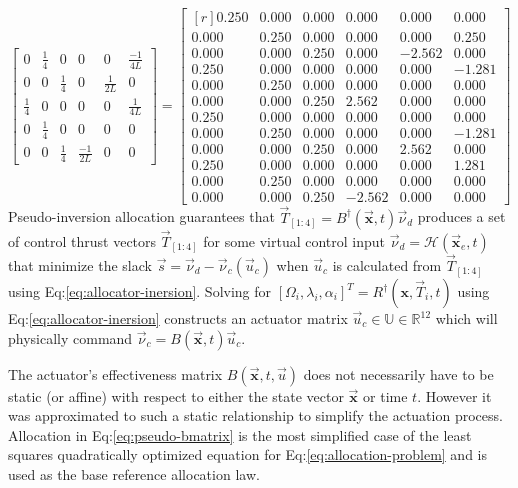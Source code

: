 \begin{subequations}
\begin{equation}
\begin{bmatrix}
0 & \frac{1}{4} & 0 & 0 & 0 & \frac{-1}{4L}\\
0 & 0 & \frac{1}{4} & 0 & \frac{1}{2L} & 0\\
\frac{1}{4} & 0 & 0 & 0 & 0 & \frac{1}{4L}\\
0 & \frac{1}{4} & 0 & 0 & 0 & 0\\
0 & 0 & \frac{1}{4} & \frac{-1}{2L} & 0 & 0
\end{bmatrix}
\end{equation}
\begin{equation}
=\begin{bmatrix*}[r]
0.250 & 0.000 & 0.000 & 0.000 & 0.000 & 0.000\\
0.000 & 0.250 & 0.000 & 0.000 & 0.000 & 0.250\\
0.000 & 0.000 & 0.250 & 0.000 & -2.562 & 0.000\\
0.250 & 0.000 & 0.000 & 0.000 & 0.000 & -1.281\\
0.000 & 0.250 & 0.000 & 0.000 & 0.000 & 0.000\\
0.000 & 0.000 & 0.250 & 2.562 & 0.000 & 0.000\\
0.250 & 0.000 & 0.000 & 0.000 & 0.000 & 0.000\\
0.000 & 0.250 & 0.000 & 0.000 & 0.000 & -1.281\\
0.000 & 0.000 & 0.250 & 0.000 & 2.562 & 0.000\\
0.250 & 0.000 & 0.000 & 0.000 & 0.000 & 1.281\\
0.000 & 0.250 & 0.000 & 0.000 & 0.000 & 0.000\\
0.000 & 0.000 & 0.250 & -2.562 & 0.000 & 0.000
\end{bmatrix*}
\end{equation}
\end{subequations}
Pseudo-inversion allocation guarantees that $\vec{T}_{[1:4]}=B^\dagger(\vec{\mathbf{x}},t)\vec{\nu}_d$ produces a set of control thrust vectors $\vec{T}_{[1:4]}$ for some virtual control input $\vec{\nu}_d=\mathcal{H}(\vec{\mathbf{x}}_e,t)$ that minimize the slack $\vec{s}=\vec{\nu}_d-\vec{\nu}_c(\vec{u}_c)$ when $\vec{u}_c$ is calculated from $\vec{T}_{[1:4]}$ using Eq:\ref{eq:allocator-inersion}. Solving for $[\Omega_i,\lambda_i,\alpha_i]^T=R^\dagger(\mathbf{x},\vec{T}_i,t)$ using Eq:\ref{eq:allocator-inersion} constructs an actuator matrix $\vec{u}_c\in\mathbb{U}\in\mathbb{R}^{12}$ which will physically command $\vec{\nu}_c=B(\vec{\mathbf{x}},t)\vec{u}_c$. 
\par
The actuator's effectiveness matrix $B(\vec{\mathbf{x}},t,\vec{u})$ does not necessarily have to be static (or affine) with respect to either the state vector $\vec{\mathbf{x}}$ or time $t$. However it was approximated to such a static relationship to simplify the actuation process. Allocation in Eq:\ref{eq:pseudo-bmatrix} is the most simplified case of the least squares quadratically optimized equation for Eq:\ref{eq:allocation-problem} and is used as the base reference allocation law.
